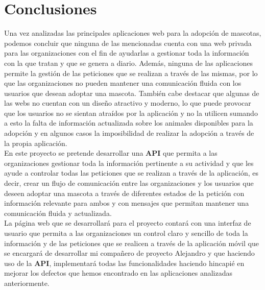 \section{Conclusiones}\label{sec:conclusiones-estado-del-arte}

Una vez analizadas las principales aplicaciones web para la adopción de mascotas, podemos concluir que ninguna de las
mencionadas cuenta con una web privada para las organizaciones con el fin de ayudarlas a gestionar
toda la información con la que tratan y que se genera a diario. Además, ninguna de las aplicaciones permite la
gestión de las peticiones que se realizan a través de las mismas, por lo que las organizaciones no pueden mantener
una comunicación fluida con los usuarios que desean adoptar una mascota. También cabe destacar que algunas de las
webs no cuentan con un diseño atractivo y moderno, lo que puede provocar que los usuarios no se sientan atraídos
por la aplicación y no la utilicen sumando a esto la falta de información actualizada sobre los animales disponibles
para la adopción y en algunos casos la imposibilidad de realizar la adopción a través de la propia aplicación. \\

En este proyecto se pretende desarrollar una \textbf{API} que permita a las organizaciones gestionar toda la información
pertinente a su actividad y que les ayude a controlar todas las peticiones que se realizan a través de la aplicación, es
decir, crear un flujo de comunicación entre las organizaciones y los usuarios que deseen adoptar una mascota a través
de diferentes estados de la petición con información relevante para ambos y con mensajes que permitan mantener
una comunicación fluida y actualizada. \\

La página web que se desarrollará para el proyecto contará con una interfaz de usuario que permita a las organizaciones
un control claro y sencillo de toda la información y de las peticiones que se realicen a través de la aplicación móvil
que se encargará de desarrollar mi compañero de proyecto Alejandro y que haciendo uso de la \textbf{API}, implementará todas
las funcionalidades haciendo hincapié en mejorar los defectos que hemos encontrado en las aplicaciones analizadas
anteriormente. \\